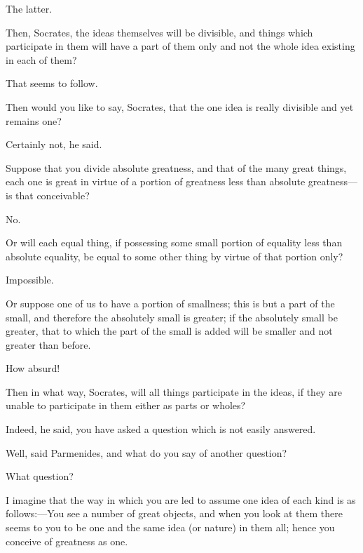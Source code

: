 \documentclass[11pt,letter]{article}
\begin{document}
\par  The latter.

\par  Then, Socrates, the ideas themselves will be divisible, and things which participate in them will have a part of them only and not the whole idea existing in each of them?

\par  That seems to follow.

\par  Then would you like to say, Socrates, that the one idea is really divisible and yet remains one?

\par  Certainly not, he said.

\par  Suppose that you divide absolute greatness, and that of the many great things, each one is great in virtue of a portion of greatness less than absolute greatness—is that conceivable?

\par  No.

\par  Or will each equal thing, if possessing some small portion of equality less than absolute equality, be equal to some other thing by virtue of that portion only?

\par  Impossible.

\par  Or suppose one of us to have a portion of smallness; this is but a part of the small, and therefore the absolutely small is greater; if the absolutely small be greater, that to which the part of the small is added will be smaller and not greater than before.

\par  How absurd!

\par  Then in what way, Socrates, will all things participate in the ideas, if they are unable to participate in them either as parts or wholes?

\par  Indeed, he said, you have asked a question which is not easily answered.

\par  Well, said Parmenides, and what do you say of another question?

\par  What question?

\par  I imagine that the way in which you are led to assume one idea of each kind is as follows:—You see a number of great objects, and when you look at them there seems to you to be one and the same idea (or nature) in them all; hence you conceive of greatness as one.
\end{document}
